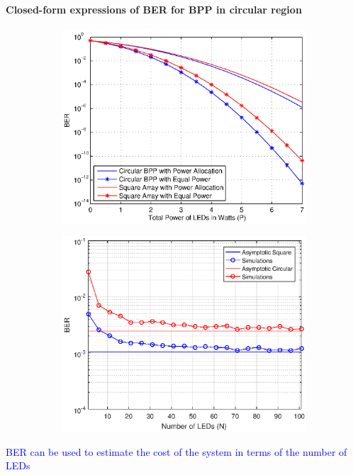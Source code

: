 \documentclass[slidestop,usepdftitle=false]{gvvslides}
\begin{document}
\begin{frame}
\frametitle{\,}
\framesubtitle{Closed-form expressions of BER for BPP in circular region}
\begin{figure}
 \begin{subfigure}[t]{0.49\framewidth}
        \centering
        \includegraphics[width=\columnwidth]{berVSp}
\label{fig1:subfig4}
    \end{subfigure}
        \begin{subfigure}[t]{0.49\framewidth}
        \centering
        \includegraphics[width=\columnwidth]{berVSNdiffGeom}
\label{fig1:subfig2}
    \end{subfigure}
\end{figure}
\vfill
 \textcolor{blue}{ BER can be used to estimate the cost of the system in terms of the number of LEDs}
\end{frame}
\end{document}
